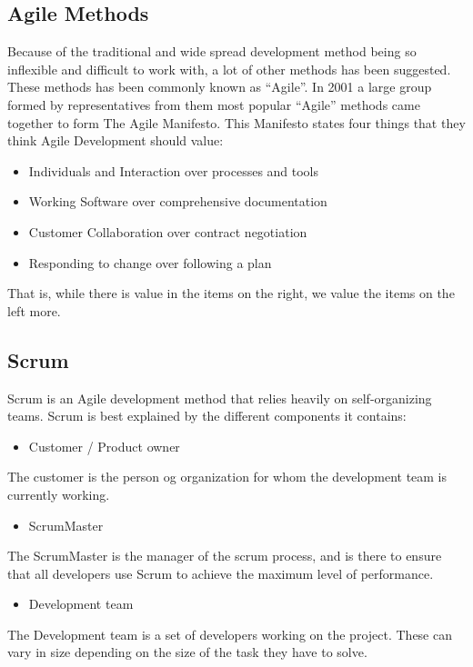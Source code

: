 \subsection{Agile Methods}

Because of the traditional and wide spread development method being so inflexible and difficult to work with, a lot of other methods has been suggested. These methods has been commonly known as ``Agile''. In 2001 a large group formed by representatives from them most popular ``Agile'' methods came together to form The Agile Manifesto. This Manifesto states four things that they think Agile Development should value:
\begin{itemize}
	\item Individuals and Interaction over processes and tools
	\item Working Software over comprehensive documentation
	\item Customer Collaboration over contract negotiation
	\item Responding to change over following a plan
\end{itemize}

That is, while there is value in the items on the right, we value the items on the left more.

\subsection{Scrum}
Scrum is an Agile development method that relies heavily on self-organizing teams. Scrum is best explained by the different components it contains:


\begin{itemize}
	\item Customer / Product owner
\end{itemize}
The customer is the person og organization for whom the development team is currently working.

\begin{itemize}
	\item ScrumMaster
\end{itemize}
The ScrumMaster is the manager of the scrum process, and is there to ensure that all developers use Scrum to achieve the maximum level of performance.

\begin{itemize}
	\item Development team
\end{itemize}
The Development team is a set of developers working on the project. These can vary in size depending on the size of the task they have to solve.

